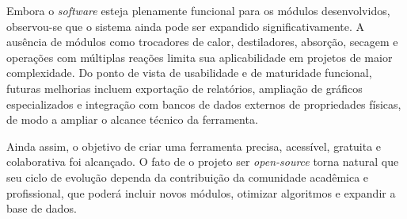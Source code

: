 Embora o \textit{software} esteja plenamente funcional para os módulos desenvolvidos, observou-se que o sistema ainda pode ser expandido significativamente. A ausência de módulos como trocadores de calor, destiladores, absorção, secagem e operações com múltiplas reações limita sua aplicabilidade em projetos de maior complexidade. Do ponto de vista de usabilidade e de maturidade funcional, futuras melhorias incluem exportação de relatórios, ampliação de gráficos especializados e integração com bancos de dados externos de propriedades físicas, de modo a ampliar o alcance técnico da ferramenta.

Ainda assim, o objetivo de criar uma ferramenta precisa, acessível, gratuita e colaborativa foi alcançado. O fato de o projeto ser \textit{open-source} torna natural que seu ciclo de evolução dependa da contribuição da comunidade acadêmica e profissional, que poderá incluir novos módulos, otimizar algoritmos e expandir a base de dados.
